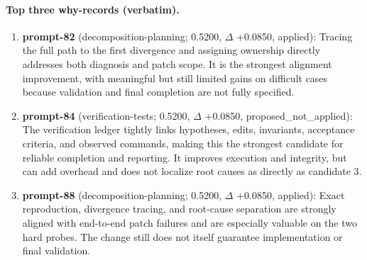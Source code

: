 \paragraph{Top three why-records (verbatim).}\begin{enumerate}\itemsep1pt
\item \textbf{prompt-82} (decomposition-planning; 0.5200, $\Delta$ +0.0850, applied): Tracing the full path to the first divergence and assigning ownership directly addresses both diagnosis and patch scope. It is the strongest alignment improvement, with meaningful but still limited gains on difficult cases because validation and final completion are not fully specified.
\item \textbf{prompt-84} (verification-tests; 0.5200, $\Delta$ +0.0850, proposed\_not\_applied): The verification ledger tightly links hypotheses, edits, invariants, acceptance criteria, and observed commands, making this the strongest candidate for reliable completion and reporting. It improves execution and integrity, but can add overhead and does not localize root causes as directly as candidate 3.
\item \textbf{prompt-88} (decomposition-planning; 0.5200, $\Delta$ +0.0850, applied): Exact reproduction, divergence tracing, and root-cause separation are strongly aligned with end-to-end patch failures and are especially valuable on the two hard probes. The change still does not itself guarantee implementation or final validation.
\end{enumerate}
